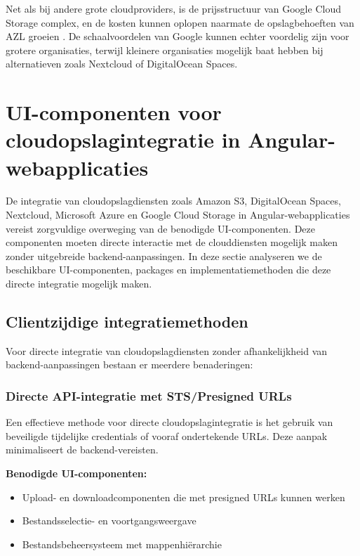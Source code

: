 Net als bij andere grote cloudproviders, is de prijsstructuur van Google Cloud Storage complex, en de kosten kunnen oplopen naarmate de opslagbehoeften van AZL groeien \autocite{google_pricing}. De schaalvoordelen van Google kunnen echter voordelig zijn voor grotere organisaties, terwijl kleinere organisaties mogelijk baat hebben bij alternatieven zoals Nextcloud of DigitalOcean Spaces.


\section{UI-componenten voor cloudopslagintegratie in Angular-webapplicaties}

De integratie van cloudopslagdiensten zoals Amazon S3, DigitalOcean Spaces, Nextcloud, Microsoft Azure en Google Cloud Storage in Angular-webapplicaties vereist zorgvuldige overweging van de benodigde UI-componenten. Deze componenten moeten directe interactie met de clouddiensten mogelijk maken zonder uitgebreide backend-aanpassingen. In deze sectie analyseren we de beschikbare UI-componenten, packages en implementatiemethoden die deze directe integratie mogelijk maken.

\subsection{Clientzijdige integratiemethoden}

Voor directe integratie van cloudopslagdiensten zonder afhankelijkheid van backend-aanpassingen bestaan er meerdere benaderingen:

\subsubsection{Directe API-integratie met STS/Presigned URLs}

Een effectieve methode voor directe cloudopslagintegratie is het gebruik van beveiligde tijdelijke credentials of vooraf ondertekende URLs. Deze aanpak minimaliseert de backend-vereisten.

\textbf{Benodigde UI-componenten:}
\begin{itemize}
    \item Upload- en downloadcomponenten die met presigned URLs kunnen werken
    \item Bestandsselectie- en voortgangsweergave
    \item Bestandsbeheersysteem met mappenhiërarchie
\end{itemize}


